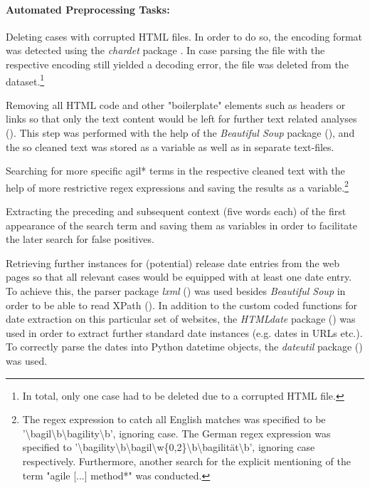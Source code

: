 \paragraph{Automated Preprocessing Tasks:} 
\begin{compactitem}
\item Deleting cases with corrupted HTML files. In order to do so, the encoding format was detected using the \textit{chardet} package \parencite{Pilgrim2015}. In case parsing the file with the respective encoding still yielded a decoding error, the file was deleted from the dataset.\footnote{In total, only one case had to be deleted due to a corrupted HTML file.}
\item Removing all HTML code and other "boilerplate" elements such as headers or links so that only the text content would be left for further text related analyses (\cite*[p. 19]{Ludeling2015}). This step was performed with the help of the \textit{Beautiful Soup} package (\cite{Richardson2007}), and the so cleaned text was stored as a variable as well as in separate text-files.
\item Searching for more specific agil* terms in the respective cleaned text with the help of more restrictive regex expressions and saving the results as a variable.\footnote{The regex expression to catch all English matches was specified to be '\textbackslash bagil\textbackslash b\textbar \textbackslash bagility\textbackslash b', ignoring case. The German regex expression was specified to '\textbackslash bagility\textbackslash b\textbar \textbackslash bagil\textbackslash w\{0,2\}\textbackslash b\textbar \textbackslash bagilität\textbackslash b', ignoring case respectively. Furthermore, another search for the explicit mentioning of the term "agile [...] method*" was conducted.} 
\item Extracting the preceding and subsequent context (five words each) of the first appearance of the search term and saving them as variables in order to facilitate the later search for false positives. 
\item Retrieving further instances for (potential) release date entries from the web pages so that all relevant cases would be equipped with at least one date entry. To achieve this, the parser package \textit{lxml} (\cite{Faassen2006}) was used besides \textit{Beautiful Soup} in order to be able to read XPath (\cite{Clark1999}). In addition to the custom coded functions for date extraction on this particular set of websites, the \textit{HTMLdate} package (\cite{Barbaresi2020}) was used in order to extract further standard date instances (e.g. dates in URLs etc.). To correctly parse the dates into Python datetime objects, the \textit{dateutil} package (\cite{Niemeyer2003}) was used.

\end{compactitem}
